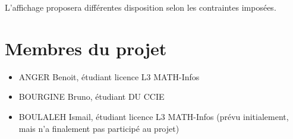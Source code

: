 L'affichage proposera différentes disposition selon les contraintes imposées.

\section{Membres du projet}

\begin{itemize}
    \item ANGER Benoit, étudiant licence L3 MATH-Infos
    \item BOURGINE Bruno, étudiant DU CCIE
    \item BOULALEH Ismail, étudiant licence L3 MATH-Infos (prévu initialement, mais n'a finalement pas
    participé au projet)
\end{itemize}

